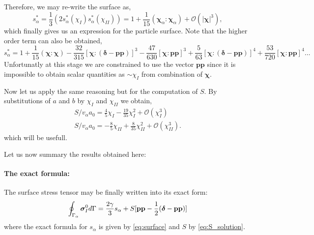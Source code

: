 Therefore, we may re-write the surface as, 
\begin{equation}
    s_\alpha^* 
    = \frac{1}{3}\left(
        2 s_\alpha^*(\chi_I)
        s_\alpha^*(\chi_{II})
    \right)
    = 
    1 + \frac{1}{15} (\bm\chi_\alpha:\bm\chi_\alpha)
    + \mathcal{O}(|\bm\chi|^3),
\end{equation}
which finally gives us an expression for the particle surface. 
Note that the higher order term can also be obtained, 
\begin{equation}
    s_\alpha^* 
    = 
    1 + \frac{1}{15} (\bm\chi:\bm\chi)
    - \frac{32}{315} [\bm\chi : (\bm\delta - \textbf{pp})]^3
    - \frac{47}{630} [\bm\chi : \textbf{pp}]^3
    + \frac{5}{63} [\bm\chi : (\bm\delta - \textbf{pp})]^4
    + \frac{53}{720} [\bm\chi : \textbf{pp}]^4
    \ldots
    \label{eq:surface}
\end{equation}
Unfortunatly at this stage we are constrained  to use the vector $\textbf{pp}$ since it is impossible to obtain scalar quantities as $\sim \chi_I$ from combination of $\bm\chi$. 

Now let us  apply the same reasoning but for the computation of $S$. 
By substitutions of $a$ and $b$ by $\chi_I$ and $\chi_{II}$ we obtain,
\begin{align}
    S / v_\alpha a_0 =  \frac{4}{5} \chi_I - \frac{19}{35}\chi_I^2 +\mathcal{O}(\chi_I^3)\\
    S / v_\alpha a_0 =  - \frac{8}{5} \chi_{II} + \frac{8}{35}\chi_{II}^2+\mathcal{O}(\chi_{II}^3). 
    \label{eq:taylor_exp_S}
\end{align}
which will be usefull. 



Let us now summary the results obtained here: 

\paragraph{The exact formula: }
The surface stress tensor may be finally written into its exact form: 
\begin{equation*}
    \intS{\bm\sigma_I^0}
    = \frac{2\gamma}{3}s_\alpha 
    + S[\textbf{pp} - \frac{1}{2}(\bm\delta - \textbf{pp})]
    \label{eq:exact_solution}
\end{equation*}
where the exact formula for $s_\alpha$ is given by \ref{eq:surface} and $S$ by \ref{eq:S_solution}.  

